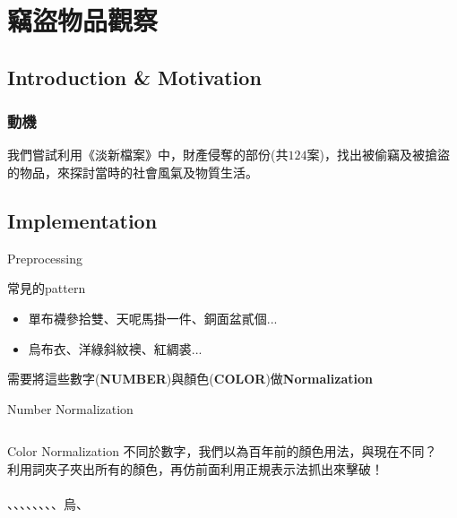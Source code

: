 \documentclass{beamer}
\begin{document}
\section{竊盜物品觀察}
\subsection{Introduction \& Motivation}
\begin{frame}
	\frametitle{動機}
    我們嘗試利用《淡新檔案》中，財產侵奪的部份(共$124$案)，找出被偷竊及被搶盜的物品，來探討當時的社會風氣及物質生活。
\end{frame}
\subsection{Implementation}
\begin{frame}{Preprocessing}
\begin{block}{常見的pattern}
\begin{itemize}
    \item 單布襪參拾雙、天呢馬掛一件、銅面盆貳個...
    \item 烏布衣、洋綠斜紋襖、紅綢裘...
\end{itemize}
\MVRightarrow{} 需要將這些數字(\textbf{NUMBER})與顏色(\textbf{COLOR})做\textbf{Normalization}
\end{block}
\end{frame}

\begin{frame}{Number Normalization}
\inputminted{python}{code/normalize.py}    
\end{frame}

\begin{frame}{Color Normalization}
不同於數字，我們以為百年前的顏色用法，與現在不同？\\
\MVRightarrow{}利用詞夾子夾出所有的顏色，再仿前面利用正規表示法抓出來擊破！\\\\
\center \color{yellow}{黃}、\color{red}{紅}、\color{cyan}{青}、\color{green}{洋綠}、\color{magenta}{洋紅}、\color{black}{黑}、\colorbox{black}{\color{white}{白}}、\color{purple}{紫}、\color{black}烏、\color{blue}{藍}
\end{frame}
\end{document}

